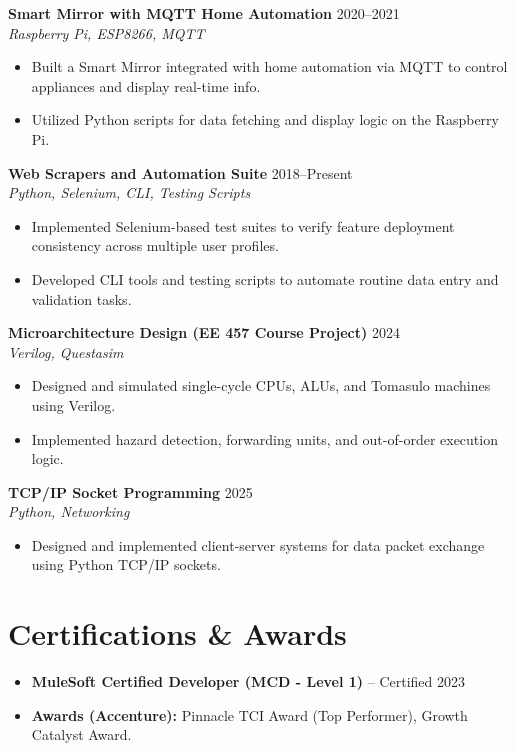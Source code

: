\documentclass[letterpaper,10pt]{article}
\begin{document}
\textbf{Smart Mirror with MQTT Home Automation} \hfill 2020--2021 \\
\textit{Raspberry Pi, ESP8266, MQTT}
\begin{itemize}
    \item Built a Smart Mirror integrated with home automation via MQTT to control appliances and display real-time info.
    \item Utilized Python scripts for data fetching and display logic on the Raspberry Pi.
\end{itemize}

\textbf{Web Scrapers and Automation Suite} \hfill 2018--Present \\
\textit{Python, Selenium, CLI, Testing Scripts}
\begin{itemize}
    \item Implemented Selenium-based test suites to verify feature deployment consistency across multiple user profiles.
    \item Developed CLI tools and testing scripts to automate routine data entry and validation tasks.
\end{itemize}

\textbf{Microarchitecture Design (EE 457 Course Project)} \hfill 2024 \\
\textit{Verilog, Questasim}
\begin{itemize}
    \item Designed and simulated single-cycle CPUs, ALUs, and Tomasulo machines using Verilog.
    \item Implemented hazard detection, forwarding units, and out-of-order execution logic.
\end{itemize}

\textbf{TCP/IP Socket Programming} \hfill 2025 \\
\textit{Python, Networking}
\begin{itemize}
    \item Designed and implemented client-server systems for data packet exchange using Python TCP/IP sockets.
\end{itemize}

\section*{Certifications \& Awards}
\begin{itemize} \itemsep -2pt
    \item \textbf{MuleSoft Certified Developer (MCD - Level 1)} -- Certified 2023
    \item \textbf{Awards (Accenture):} Pinnacle TCI Award (Top Performer), Growth Catalyst Award.
\end{itemize}
\end{document}
